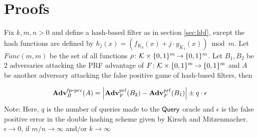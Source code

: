 \section{Proofs}
\begin{theorem}\label{thm}
Fix $k, m, n > 0$ and define a hash-based filter as in section \ref{sec:hbf}, except the hash functions are defined by $h_j(x) = \left( f_{K_0}(x) + j\cdot g_{K_1}(x)\right) \bmod m$. Let $Func(m,m)$ be the set of all functions $\rho \colon {\cal K} \times \{0,1\}^m {\:\stackrel{{\scriptscriptstyle \hspace{0.2em}}} {\rightarrow}\:} \{0,1\}^m$. Let $B_1, B_2$ be 2 adversaries attacking the PRF advantage of $F \colon {\cal K} \times \{0,1\}^m {\:\stackrel{{\scriptscriptstyle \hspace{0.2em}}} {\rightarrow}\:} \{0,1\}^m$ and $A$ be another adversary attacking the false positive game of hash-based filters, then 

\begin{equation}
\mathrm{\mathbf{Adv}}^{\mathrm{fp\mbox{-}prv}}_{B}(A) = {\displaystyle \left| { \mathbf{Adv}^{\mathrm{prf}}_{F}(B_2) - \mathbf{Adv}^{\mathrm{prf}}_{F}(B_1)} \right| } \pm q \cdot \epsilon
\end{equation}
Note: Here, $q$ is the number of queries made to the $\mathsf{Query}$ oracle and $\epsilon$ is the false positive error in the double hashing scheme given by Kirsch and Mitzenmacher. $\epsilon \rightarrow 0$, if $m/n \rightarrow \infty$ and/or $k \rightarrow \infty$ \cite{xxx}
\end{theorem}

